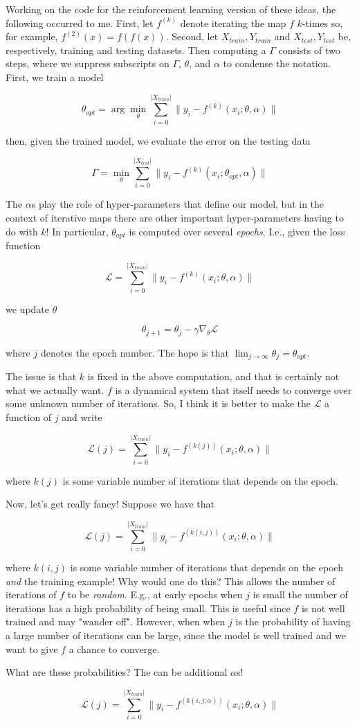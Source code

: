 \documentclass{article}
\begin{document}
Working on the code for the reinforcement learning version of these ideas, the following occurred to me.  First, let $f^{(k)}$ denote iterating the map $f$ $k$-times so, for example, $f^{(2)}(x) = f(f(x))$.  Second, let $X_{train},Y_{train}$ and $X_{test},Y_{test}$ be, respectively, training and testing datasets.  Then
computing a $\Gamma$ consists of two steps, where we suppress subscripts on $\Gamma$, $\theta$, and $\alpha$ to condense the notation.  First, we train a model

$$
\theta_{opt} = \arg \min_\theta \sum_{i=0}^{|X_{train}|} \|y_i - f^{(k)}(x_i;\theta,\alpha)\| 
$$

then, given the trained model, we evaluate the error on the testing data 

$$
\Gamma = \min_\theta \sum_{i=0}^{|X_{test}|} \|y_i - f^{(k)}(x_i;\theta_{opt},\alpha)\| 
$$

The $\alpha$s play the role of hyper-parameters that define our model, but in the context of iterative maps there are other important hyper-parameters having to do with $k$!  In particular, $\theta_{opt}$ is computed over several \emph{epochs}.  I.e., given the loss function

$$
\mathcal{L} = \sum_{i=0}^{|X_{train}|} \|y_i - f^{(k)}(x_i;\theta,\alpha)\|
$$

we update $\theta$

$$
\theta_{j+1} = \theta_j  - \gamma \nabla_\theta \mathcal{L} 
$$

where $j$ denotes the epoch number.  The hope is that $\lim_{j\to\infty} \theta_j = \theta_{opt}$.

The issue is that $k$ is fixed in the above computation, and that is certainly not what we actually want. 
$f$ is a dynamical system that itself needs to converge over some unknown number of iterations.  So, I think it is better to make the $\mathcal{L}$ 
a function of $j$ and write

$$
\mathcal{L}(j) = \sum_{i=0}^{|X_{train}|} \|y_i - f^{(k(j))}(x_i;\theta,\alpha)\|
$$

where $k(j)$ is some variable number of iterations that depends on the epoch.

Now, let's get really fancy!  Suppose we have that 

$$
\mathcal{L}(j) = \sum_{i=0}^{|X_{train}|} \|y_i - f^{(k(i,j))}(x_i;\theta,\alpha)\|
$$

where $k(i,j)$ is some variable number of iterations that depends on the epoch \emph{and} the training example!  Why would one do this?  This allows the number of iterations of $f$ to be \emph{random}.  E.g., at early epochs when $j$ is small the number of iterations has a high probability of being small.  This is useful  since $f$ is not well trained and may "wander off".  However, when when $j$ is the probability of having a large number of iterations can be large, since  the model is well trained and we want to give $f$ a chance to converge.

What are these probabilities?  The can be additional $\alpha$s!

$$
\mathcal{L}(j) = \sum_{i=0}^{|X_{train}|} \|y_i - f^{(k(i,j;\alpha))}(x_i;\theta,\alpha)\|
$$
\end{document}
